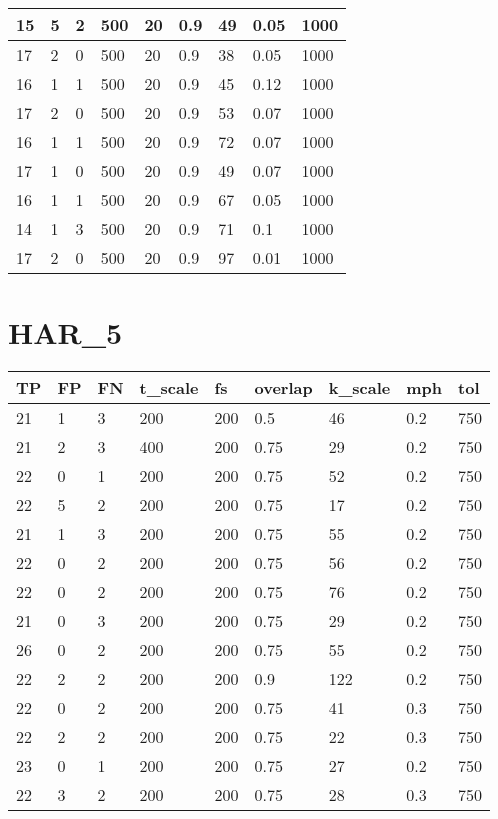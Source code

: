 \begin{table}[!ht]
\begin{tabular}{|l|l|l|l|l|l|l|l|l|}
        15 & 5 & 2 & 500 & 20 & 0.9 & 49 & 0.05 & 1000 \\ \hline
        17 & 2 & 0 & 500 & 20 & 0.9 & 38 & 0.05 & 1000 \\ \hline
        16 & 1 & 1 & 500 & 20 & 0.9 & 45 & 0.12 & 1000 \\ \hline
        17 & 2 & 0 & 500 & 20 & 0.9 & 53 & 0.07 & 1000 \\ \hline
        16 & 1 & 1 & 500 & 20 & 0.9 & 72 & 0.07 & 1000 \\ \hline
        17 & 1 & 0 & 500 & 20 & 0.9 & 49 & 0.07 & 1000 \\ \hline
        16 & 1 & 1 & 500 & 20 & 0.9 & 67 & 0.05 & 1000 \\ \hline
        14 & 1 & 3 & 500 & 20 & 0.9 & 71 & 0.1 & 1000 \\ \hline
        17 & 2 & 0 & 500 & 20 & 0.9 & 97 & 0.01 & 1000 \\ \hline
    \end{tabular}
\end{table}


\section{HAR_5}

\begin{table}[!ht]
    \centering
    \begin{tabular}{|l|l|l|l|l|l|l|l|l|}
    \hline
        TP & FP & FN & t\_scale & fs & overlap & k\_scale & mph & tol \\ \hline
        21 & 1 & 3 & 200 & 200 & 0.5 & 46 & 0.2 & 750 \\ \hline
        21 & 2 & 3 & 400 & 200 & 0.75 & 29 & 0.2 & 750 \\ \hline
        22 & 0 & 1 & 200 & 200 & 0.75 & 52 & 0.2 & 750 \\ \hline
        22 & 5 & 2 & 200 & 200 & 0.75 & 17 & 0.2 & 750 \\ \hline
        21 & 1 & 3 & 200 & 200 & 0.75 & 55 & 0.2 & 750 \\ \hline
        22 & 0 & 2 & 200 & 200 & 0.75 & 56 & 0.2 & 750 \\ \hline
        22 & 0 & 2 & 200 & 200 & 0.75 & 76 & 0.2 & 750 \\ \hline
        21 & 0 & 3 & 200 & 200 & 0.75 & 29 & 0.2 & 750 \\ \hline
        26 & 0 & 2 & 200 & 200 & 0.75 & 55 & 0.2 & 750 \\ \hline
        22 & 2 & 2 & 200 & 200 & 0.9 & 122 & 0.2 & 750 \\ \hline
        22 & 0 & 2 & 200 & 200 & 0.75 & 41 & 0.3 & 750 \\ \hline
        22 & 2 & 2 & 200 & 200 & 0.75 & 22 & 0.3 & 750 \\ \hline
        23 & 0 & 1 & 200 & 200 & 0.75 & 27 & 0.2 & 750 \\ \hline
        22 & 3 & 2 & 200 & 200 & 0.75 & 28 & 0.3 & 750 \\ \hline
    \end{tabular}
\end{table}

